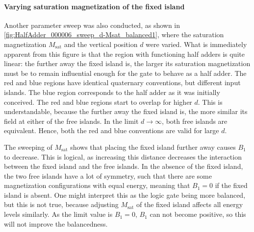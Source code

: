 \documentclass[11pt,a4paper,english,twoside]{article}
\begin{document}
\paragraph{Varying saturation magnetization of the fixed island}
Another parameter sweep was also conducted, as shown in \cref{fig:HalfAdder_000006_sweep_d-Msat_balanced1}, where the saturation magnetization $M_\mathrm{sat}$ and the vertical position $d$ were varied. What is immediately apparent from this figure is that the region with functioning half adders is quite linear: the further away the fixed island is, the larger its saturation magnetization must be to remain influential enough for the gate to behave as a half adder. The red and blue regions have identical quaternary conventions, but different input islands. The blue region corresponds to the half adder as it was initially conceived. The red and blue regions start to overlap for higher $d$. This is understandable, because the further away the fixed island is, the more similar its field at either of the free islands. In the limit $d\rightarrow\infty$, both free islands are equivalent. Hence, both the red and blue conventions are valid for large $d$. \par
The sweeping of $M_\mathrm{sat}$ shows that placing the fixed island further away causes $B_1$ to decrease. This is logical, as increasing this distance decreases the interaction between the fixed island and the free islands. In the absence of the fixed island, the two free islands have a lot of symmetry, such that there are some magnetization configurations with equal energy, meaning that $B_1=0$ if the fixed island is absent. One might interpret this as the logic gate being more balanced, but this is not true,
because adjusting $M_\mathrm{sat}$ of the fixed island affects all energy levels similarly. As the limit value is $B_1=0$, $B_1$ can not become positive, so this will not improve the balancedness.
\end{document}
